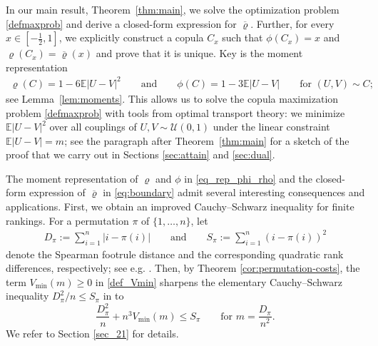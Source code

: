 \documentclass{article}
\newcommand{\brho}{\overline\varrho}
\newcommand{\E}{\mathbb{E}}
\newcommand{\cU}{\mathcal{U}}
\begin{document}
In our main result, Theorem~\ref{thm:main}, we solve the optimization problem \eqref{defmaxprob} and derive a closed-form expression for $\overline{\varrho}$. Further, for every $x\in[-\tfrac12,1]$, we explicitly construct a copula $C_x$ such that $\phi(C_x)=x$ and $\varrho(C_x)=\overline{\varrho}(x)$ and prove that it is unique.
Key is the moment representation
\begin{align}\label{eq_rep_phi_rho}
    \varrho(C)
    =
    1-6\E|U-V|^2
    \qquad \text{and} \qquad
    \phi(C)
    =
    1-3\E|U-V| \qquad \text{for } (U,V)\sim C; 
\end{align}
see Lemma~\ref{lem:moments}. This allows us to solve the copula maximization problem \eqref{defmaxprob} with tools from optimal transport theory: we minimize \(\E |U-V|^2\) over all couplings of \(U,V\sim \cU(0,1)\) under the linear constraint \(\E|U-V|=m\); see the paragraph after Theorem~\ref{thm:main} for a sketch of the proof that we carry out in Sections \ref{sec:attain} and \ref{sec:dual}.

The moment representation of \(\varrho\) and \(\phi\) in \eqref{eq_rep_phi_rho} and the closed-form expression of \(\brho\) in  \eqref{eq:boundary} admit several interesting consequences and applications.
First, we obtain an improved Cauchy--Schwarz inequality for finite rankings. For a permutation
\(\pi\) of \(\{1,\ldots,n\}\), let
\begin{align*}
    D_\pi
    :=
    \sum_{i=1}^n |i-\pi(i)| \qquad \text{and} \qquad
    S_\pi
    :=
    \sum_{i=1}^n (i-\pi(i))^2
\end{align*}
denote the Spearman footrule distance and the corresponding quadratic rank differences, respectively; see e.g. \cite{clemencon2013ranking,diaconis1977spearman}. Then, by Theorem \ref{cor:permutation-costs}, the term \(V_{\operatorname{min}}(m)\geq 0\) in \eqref{def_Vmin} sharpens the elementary
Cauchy--Schwarz inequality \(D_\pi^2/n\leq S_\pi\) in \cite[p.~268]{diaconis1977spearman} to
\[
    \frac{D_\pi^2}{n} + n^3 V_{\operatorname{min}}(m) \leq S_\pi \qquad \text{for } m = \frac{D_\pi}{n^2}.
\]
We refer to Section \ref{sec_21} for details.
\end{document}
